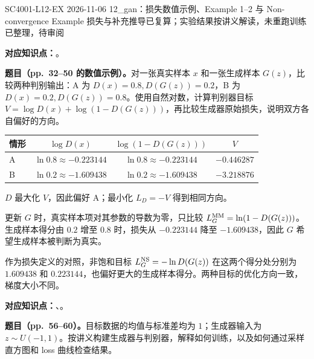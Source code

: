 

\examplemeta
  {SC4001-L12-EX}
  {2026-11-06}
  {12\_gan：损失数值示例、Example 1--2 与 Non-convergence Example}
  {损失与补充推导已复算；实验结果按讲义解读，未重跑训练}
  {已整理，待审阅}


\textbf{对应知识点：}。

\textbf{题目（pp.~32--50 的数值示例）。}对一张真实样本 $x$ 和一张生成样本 $G(z)$，比较两种判别输出：A 为 $D(x)=0.8,D(G(z))=0.2$，B 为 $D(x)=0.2,D(G(z))=0.8$。使用自然对数，计算判别器目标 $V=\log D(x)+\log(1-D(G(z)))$，再比较生成器原始损失，说明双方各自偏好的方向。

\begin{workedsolution}
\begin{center}
\small
\begin{tabular}{@{}lccc@{}}
\toprule
情形 & $\log D(x)$ & $\log(1-D(G(z)))$ & $V$ \\
\midrule
A & $\ln0.8\approx-0.223144$ & $\ln0.8\approx-0.223144$ & $-0.446287$ \\
B & $\ln0.2\approx-1.609438$ & $\ln0.2\approx-1.609438$ & $-3.218876$ \\
\bottomrule
\end{tabular}
\end{center}
$D$ 最大化 $V$，因此偏好 A；最小化 $L_D=-V$ 得到相同方向。

更新 $G$ 时，真实样本项对其参数的导数为零，只比较 $L_G^{\rm MM}=\ln(1-D(G(z)))$。生成样本得分由 $0.2$ 增至 $0.8$ 时，损失从 $-0.223144$ 降至 $-1.609438$，因此 $G$ 希望生成样本被判断为真实。

作为损失定义的对照，非饱和目标 $L_G^{\rm NS}=-\ln D(G(z))$ 在这两个得分处分别为 $1.609438$ 和 $0.223144$，也偏好更大的生成样本得分。两种目标的优化方向一致，梯度大小不同。
\end{workedsolution}


\textbf{对应知识点：}、。

\textbf{题目（pp.~56--60）。}目标数据的均值与标准差均为 $1$；生成器输入为 $z\sim U(-1,1)$。按讲义构建生成器与判别器，解释如何训练，以及如何通过采样直方图和 loss 曲线检查结果。

